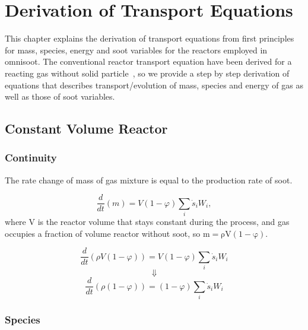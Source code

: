 \chapter{Derivation of Transport Equations}
This chapter explains the derivation of transport equations from first principles for mass, species, energy and soot variables for the reactors employed in omnisoot. The conventional reactor transport equation have been derived for a reacting gas without solid particle~\citep{kee2017chemically}, so we provide a step by step derivation of equations that describes transport/evolution of mass, species and energy of gas as well as those of soot variables.

\section{Constant Volume Reactor}
\label{sec:derivconstuv}

\subsection{Continuity}
The rate change of mass of gas mixture is equal to the production rate of soot.

\begin{equation*}
	\frac{d}{dt}\left(m\right)=V\left(1-\varphi\right)\sum_{i}{{\dot{s}}_iW_i},
\end{equation*}
where V is the reactor volume that stays constant during the process, and gas occupies a fraction of volume reactor without soot, so $\mathrm{m= \rho V (1-\varphi)}$.

\begin{equation*}
	\frac{d}{dt}\left(\rho V(1-\varphi)\right)=V\left(1-\varphi\right)\sum_{i}{{\dot{s}}_iW_i}
\end{equation*}
\begin{equation*}
	\Downarrow
\end{equation*}
\begin{equation}
	\frac{d}{dt}\left(\rho (1-\varphi)\right)=\left(1-\varphi\right)\sum_{i}{{\dot{s}}_iW_i}
	\label{eqn:app_consuvcont}
\end{equation}

\subsection{Species}

